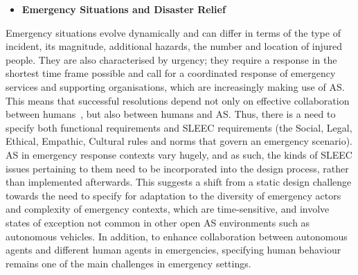 \documentclass[sigconf,nonacm]{acmart}%
\begin{document}
	\begin{itemize}[leftmargin=0.5cm]
		\item \textbf{Emergency Situations and Disaster Relief}
	\end{itemize}
	Emergency situations evolve dynamically and can differ in terms of the type of incident, its magnitude, additional hazards, the number and location of injured people. They are also characterised by urgency; they require a response in the shortest time frame possible and call for a coordinated response of emergency services and supporting organisations, which are increasingly making use of AS. This means that successful resolutions depend not only on effective collaboration between humans~\cite{james2011organizational}, but also between humans and AS. Thus, there is a need to specify both functional requirements and SLEEC requirements (the Social, Legal, Ethical, Empathic, Cultural rules and norms that govern an emergency scenario). AS in emergency response contexts vary hugely, and as such, the kinds of SLEEC issues pertaining to them need to be incorporated into the design process, rather than implemented afterwards. This suggests a shift from a static design challenge towards the need to specify for adaptation to the diversity of emergency actors and complexity of emergency contexts, which are time-sensitive, and involve states of exception not common in other open AS environments such as autonomous vehicles. In addition, to enhance collaboration between autonomous agents and different human agents in emergencies, specifying human behaviour remains one of the main challenges in emergency settings. 

	
\end{document}

